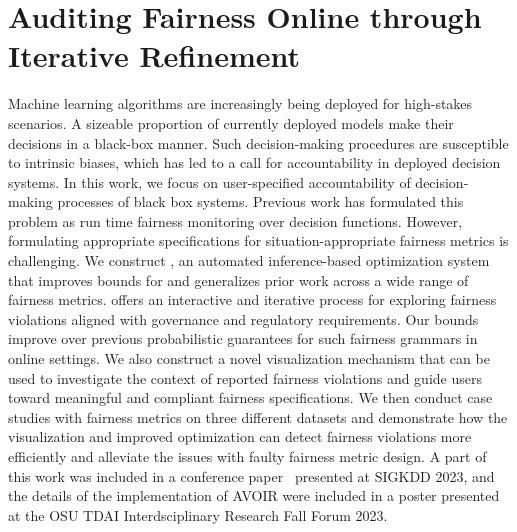 \chapter{Auditing Fairness Online through Iterative Refinement}
\label{chp:avoir}

Machine learning algorithms are increasingly being deployed for high-stakes scenarios. 
A sizeable proportion of currently deployed models make their decisions in a black-box manner. 
Such decision-making procedures are susceptible to intrinsic biases, which has led to a call for accountability in deployed decision systems.
In this work, we focus on user-specified accountability of decision-making processes of black box systems.
Previous work has formulated this problem as run time fairness monitoring over decision functions.
However, formulating appropriate specifications for situation-appropriate fairness metrics is challenging.
We construct \AVOIRmethodname{}, an automated inference-based optimization system that improves bounds for and generalizes prior work across a wide range of fairness metrics.
\AVOIRmethodname{} offers an interactive and iterative process for exploring fairness violations aligned with governance and regulatory requirements.
Our bounds improve over previous probabilistic guarantees for such fairness grammars in online settings.
We also construct a novel visualization mechanism that can be used to investigate the context of reported fairness violations and guide users toward meaningful and compliant fairness specifications. 
We then conduct case studies with fairness metrics on three different datasets and demonstrate how the visualization and improved optimization can detect fairness violations more efficiently and alleviate the issues with faulty fairness metric design. 
A part of this work was included in a conference paper~\citep{maneriker2023online} presented at SIGKDD 2023, and the details of the implementation of AVOIR were included in a poster presented at the OSU TDAI Interdsciplinary Research Fall Forum 2023.













\endinput
